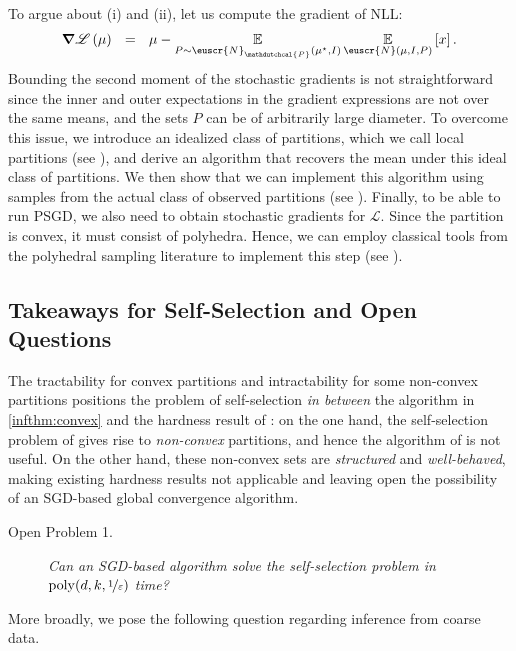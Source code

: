 \documentclass[11pt,letterpaper]{article}
\theoremstyle{plain}
\theoremstyle{definition}
\theoremstyle{remark}
\newcommand{\inparen}[1]{\ensuremath{\left(#1\right)}}
\newcommand{\E}{\operatornamewithlimits{\mathbb{E}}}
\newcommand{\Ex}{\E}
\newcommand{\nfrac}[2]{\nicefrac{#1}{#2}}
\newcommand{\poly}{\mathrm{poly}}
\newcommand{\eps}{\varepsilon}
\newcommand{\customcal}[1]{\euscr{#1}}
\newcommand{\cL}{\customcal{L}}
\newcommand{\cN}{\customcal{N}}
\newcommand{\negLL}{\ensuremath{\mathscr{L}}}
\newcommand{\hypo}[1]{\mathdutchcal{#1}}
\newcommand{\hyP}{\hypo{P}}
\newcommand{\coarseNormal}[3]{\cN_{#3}\inparen{#1,#2}}
\newcommand{\truncatedNormal}[3]{\cN\inparen{#1,#2,#3}}
\newcommand{\muStar}{{\mu^\star}}
\renewcommand{\cL}{\negLL}
\begin{document}
To argue about (i) and (ii), let us compute the gradient of NLL:
\[ \grad\cL \inparen{\mu}~~
    =~~ 
        \mu
        -
        \Ex_{P\sim \coarseNormal{\muStar}{I}{\hyP}}
        {
            \Ex_{\truncatedNormal{\mu}{I}{P}}{
                {[x]}
            }
        }\,.
        \]
Bounding the second moment of the stochastic gradients is not straightforward since the inner and outer expectations in the gradient expressions are not over the same means, and the sets $P$ can be of arbitrarily large diameter.
To overcome this issue, we introduce an idealized class of partitions, which we call local partitions (see ), and derive an algorithm that recovers the mean
under this ideal class of partitions.
We then show that we can implement this algorithm using samples from the actual class of observed partitions (see ). Finally, to be able to run PSGD, we also
need to obtain stochastic gradients for $\negLL$. Since the partition is convex, it must consist of polyhedra. Hence, we can employ classical tools from the polyhedral sampling literature \cite{lovasz2006simulated,lovasz2006fast} to implement this step (see ).


\subsection{Takeaways for Self-Selection and Open Questions}

The tractability for convex partitions and intractability for some non-convex partitions positions the problem of self-selection \emph{in between} {the algorithm in \cref{infthm:convex} and the hardness result of \cite{fotakis2021coarse}}: on the one hand, the self-selection problem of  gives rise to \emph{non-convex} partitions, and hence the algorithm of  is not useful. On the other hand, these non-convex sets are \emph{structured} and \emph{well-behaved}, making existing hardness results not applicable and leaving open the possibility of an SGD-based global convergence algorithm.

\begin{description}
    \item[Open Problem 1.] 
    {
    \emph{Can an SGD-based algorithm solve the self-selection problem in $\poly(d,k,\nfrac{1}{\eps})$ time?}}
\end{description}
More broadly, we pose the following question regarding inference from coarse data.
\end{document}
